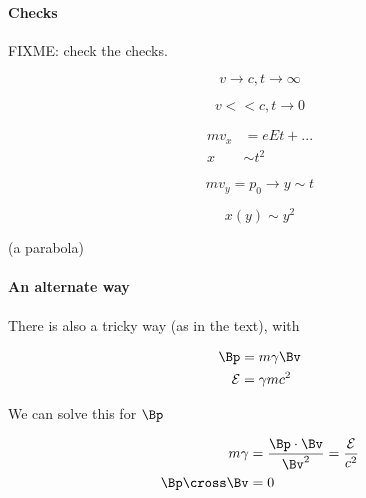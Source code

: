 {\paragraph{Checks}

FIXME: check the checks.

\begin{equation}\label{eqn:relativisticElectrodynamicsT3:420}
v \rightarrow c, t \rightarrow \infty
\end{equation}

\begin{equation}\label{eqn:relativisticElectrodynamicsT3:440}
v << c, t \rightarrow 0
\end{equation}

\begin{equation}\label{eqn:relativisticElectrodynamicsT3:990}
\begin{aligned}
m v_x &= e E t + ... \\
x &\sim t^2 
\end{aligned}
\end{equation}

\begin{equation}\label{eqn:relativisticElectrodynamicsT3:460}
m v_y = p_0 \rightarrow y \sim t
\end{equation}

\begin{equation}\label{eqn:relativisticElectrodynamicsT3:480}
x(y) \sim y^2
\end{equation}

(a parabola)

\paragraph{An alternate way}

There is also a tricky way (as in the text), with 

\begin{equation}\label{eqn:relativisticElectrodynamicsT3:160}
\begin{aligned}
\Bp &= m \gamma \Bv  \\
\mathcal{E} &= \gamma m c^2 
\end{aligned}
\end{equation}

We can solve this for \(\Bp\)

\begin{equation}\label{eqn:relativisticElectrodynamicsT3:1010}
\begin{aligned}
m \gamma &= \frac{\Bp \cdot \Bv}{\Bv^2} = \frac{\mathcal{E}}{c^2} \\
\Bp \cross \Bv &= 0
\end{aligned}
\end{equation}

}

